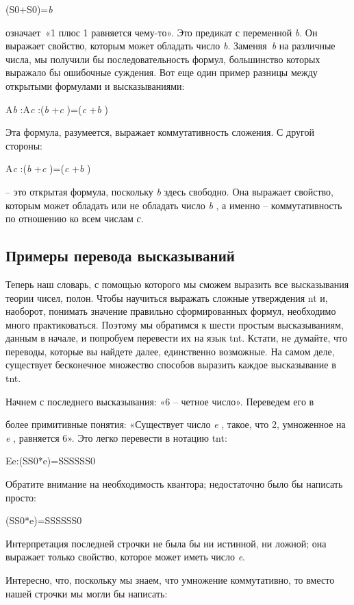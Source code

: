 \documentclass[../main.tex]{subfiles}
\begin{document}
(S0+S0)=\emph{b}

означает~«1 плюс 1 равняется чему-то». Это предикат с переменной \emph{b}. Он выражает свойство, которым может обладать число \emph{b}. Заменяя~\emph{b} на различные числа, мы получили бы последовательность формул, большинство которых выражало бы ошибочные суждения. Вот еще один пример разницы между открытыми формулами и высказываниями:

A\emph{b} :A\emph{c} :(\emph{b} +\emph{c} )=(\emph{c} +\emph{b} )

Эта формула, разумеется, выражает коммутативность сложения. С другой стороны:

A\emph{c} :(\emph{b} +\emph{c} )=(\emph{c} +\emph{b} )

\--- это открытая формула, поскольку \emph{b} здесь свободно. Она выражает свойство, которым может обладать или не обладать число \emph{b} , а именно \--- коммутативность по отношению ко всем числам \emph{с}.


\subsection{Примеры перевода высказываний}

Теперь наш словарь, с помощью которого мы сможем выразить все высказывания теории чисел, полон. Чтобы научиться выражать сложные утверждения \acs{nt} и, наоборот, понимать значение правильно сформированных формул, необходимо много практиковаться.
Поэтому мы обратимся к шести простым высказываниям, данным в начале, и попробуем перевести их на язык \acs{tnt}. Кстати, не думайте, что переводы, которые вы найдете далее, единственно возможные. На самом деле, существует бесконечное множество способов выразить каждое высказывание в \acs{tnt}.

Начнем с последнего высказывания: «6 \--- четное число». Переведем его в

более примитивные понятия: «Существует число \emph{e} , такое, что 2, умноженное на \emph{e} , равняется 6». Это легко перевести в нотацию \acs{tnt}:

Ee:(SS0*e)=SSSSSS0

Обратите внимание на необходимость квантора; недостаточно было бы написать просто:

(SS0*e)=SSSSSS0

Интерпретация последней строчки не была бы ни истинной, ни ложной; она выражает только свойство, которое может иметь число \emph{e}.

Интересно, что, поскольку мы знаем, что умножение коммутативно, то вместо нашей строчки мы могли бы написать:
\end{document}
